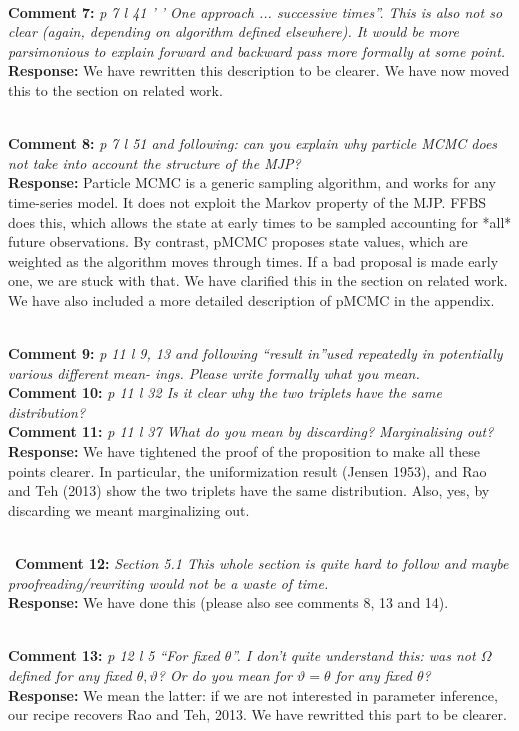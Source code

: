 \documentclass[11pt]{article}
\newcommand{\rev}[2]{\textbf{Comment #1: }\emph{#2}}
\newcommand{\resp}{\textbf{Response: }}
\begin{document}
~\\
\rev{7}{p 7 l 41 ’ ’ One approach ... successive times”. This is also not so clear (again, depending on algorithm defined elsewhere). It would be more parsimonious to explain forward and backward pass more formally at some point.} \\ 
\resp We have rewritten this description to be clearer. We have now moved this to the section on related work.

~\\
\rev{8}{p 7 l 51 and following: can you explain why particle MCMC does not take into account the structure of the MJP?}\\
\resp Particle MCMC is a generic sampling algorithm, and works for any time-series model. It does not exploit the Markov property of the MJP. FFBS does this, which allows the state at early times to be sampled accounting for *all* future observations. By contrast, pMCMC proposes state values, which are weighted as the algorithm moves through times. If a bad proposal is made early one, we are stuck with that. 
We have clarified this in the section on related work.
We have also included a more detailed description of pMCMC in the appendix.

~\\
\rev{9}{p 11 l 9, 13 and following “result in”used repeatedly in potentially various different mean- ings. Please write formally what you mean.}
~\\
\rev{10}{ p 11 l 32 Is it clear why the two triplets have the same distribution? }\\ 
\rev{11}{p 11 l 37 What do you mean by discarding? Marginalising out?} \\
\resp We have tightened the proof of the proposition to make all these points clearer. In particular, the uniformization result (Jensen 1953), and Rao and Teh (2013) show the two triplets have the same distribution. Also, yes, by discarding we meant marginalizing out.

~\\
~\rev{12}{Section 5.1 This whole section is quite hard to follow and maybe proofreading/rewriting would not be a waste of time. } \\ 
\resp{We have done this (please also see comments 8, 13 and 14).} 

~\\
\rev{13}{p 12 l 5 “For fixed $\theta$”. I don’t quite understand this: was not $\Omega$ defined for any fixed $\theta, \vartheta$? Or do you mean for $\vartheta=\theta$ for any fixed $\theta$? }\\
\resp We mean the latter: if we are not interested in parameter inference, our recipe recovers Rao and Teh, 2013. We have rewritted this part to be clearer.
\end{document}
